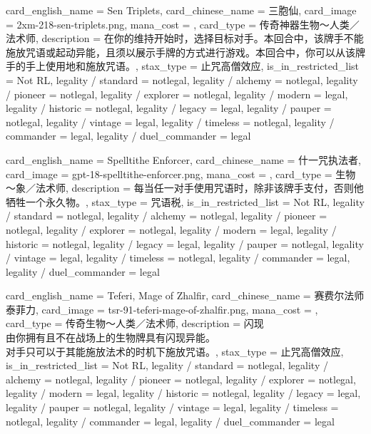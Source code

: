 \documentclass[lang = cn, color = black, 10pt]{AllThatStax}
\begin{document}
\card
{
	card_english_name = {Sen Triplets},
	card_chinese_name = {三胞仙},
	card_image = 2xm-218-sen-triplets.png,
	mana_cost = ,
	card_type = 传奇神器生物～人类／法术师,
	description = {在你的维持开始时，选择目标对手。本回合中，该牌手不能施放咒语或起动异能，且须以展示手牌的方式进行游戏。本回合中，你可以从该牌手的手上使用地和施放咒语。},
	stax_type = 止咒高僧效应,
	is_in_restricted_list = Not RL,
	legality / standard = notlegal,
	legality / alchemy = notlegal,
	legality / pioneer = notlegal,
	legality / explorer = notlegal,
	legality / modern = legal,
	legality / historic = notlegal,
	legality / legacy = legal,
	legality / pauper = notlegal,
	legality / vintage = legal,
	legality / timeless = notlegal,
	legality / commander = legal,
	legality / duel_commander = legal
}

\card
{
	card_english_name = {Spelltithe Enforcer},
	card_chinese_name = {什一咒执法者},
	card_image = gpt-18-spelltithe-enforcer.png,
	mana_cost = ,
	card_type = 生物～象／法术师,
	description = {每当任一对手使用咒语时，除非该牌手支付，否则他牺牲一个永久物。},
	stax_type = 咒语税,
	is_in_restricted_list = Not RL,
	legality / standard = notlegal,
	legality / alchemy = notlegal,
	legality / pioneer = notlegal,
	legality / explorer = notlegal,
	legality / modern = legal,
	legality / historic = notlegal,
	legality / legacy = legal,
	legality / pauper = notlegal,
	legality / vintage = legal,
	legality / timeless = notlegal,
	legality / commander = legal,
	legality / duel_commander = legal
}

\card
{
	card_english_name = {Teferi, Mage of Zhalfir},
	card_chinese_name = {赛费尔法师泰菲力},
	card_image = tsr-91-teferi-mage-of-zhalfir.png,
	mana_cost = ,
	card_type = 传奇生物～人类／法术师,
	description = {闪现\\
由你拥有且不在战场上的生物牌具有闪现异能。\\
对手只可以于其能施放法术的时机下施放咒语。},
	stax_type = 止咒高僧效应,
	is_in_restricted_list = Not RL,
	legality / standard = notlegal,
	legality / alchemy = notlegal,
	legality / pioneer = notlegal,
	legality / explorer = notlegal,
	legality / modern = legal,
	legality / historic = notlegal,
	legality / legacy = legal,
	legality / pauper = notlegal,
	legality / vintage = legal,
	legality / timeless = notlegal,
	legality / commander = legal,
	legality / duel_commander = legal
}
\end{document}
